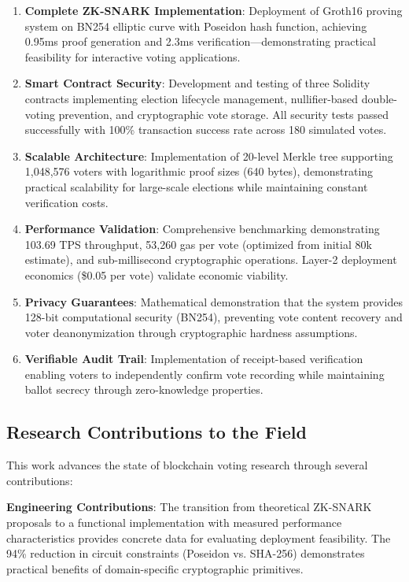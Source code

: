\documentclass[conference]{IEEEtran}
\begin{document}
\begin{enumerate}
    \item \textbf{Complete ZK-SNARK Implementation}: Deployment of Groth16 proving system on BN254 elliptic curve with Poseidon hash function, achieving 0.95ms proof generation and 2.3ms verification---demonstrating practical feasibility for interactive voting applications.
    
    \item \textbf{Smart Contract Security}: Development and testing of three Solidity contracts implementing election lifecycle management, nullifier-based double-voting prevention, and cryptographic vote storage. All security tests passed successfully with 100\% transaction success rate across 180 simulated votes.
    
    \item \textbf{Scalable Architecture}: Implementation of 20-level Merkle tree supporting 1,048,576 voters with logarithmic proof sizes (640 bytes), demonstrating practical scalability for large-scale elections while maintaining constant verification costs.
    
    \item \textbf{Performance Validation}: Comprehensive benchmarking demonstrating 103.69 TPS throughput, 53,260 gas per vote (optimized from initial 80k estimate), and sub-millisecond cryptographic operations. Layer-2 deployment economics (\$0.05 per vote) validate economic viability.
    
    \item \textbf{Privacy Guarantees}: Mathematical demonstration that the system provides 128-bit computational security (BN254), preventing vote content recovery and voter deanonymization through cryptographic hardness assumptions.
    
    \item \textbf{Verifiable Audit Trail}: Implementation of receipt-based verification enabling voters to independently confirm vote recording while maintaining ballot secrecy through zero-knowledge properties.
\end{enumerate}

\subsection{Research Contributions to the Field}

This work advances the state of blockchain voting research through several contributions:

\textbf{Engineering Contributions}: The transition from theoretical ZK-SNARK proposals to a functional implementation with measured performance characteristics provides concrete data for evaluating deployment feasibility. The 94\% reduction in circuit constraints (Poseidon vs. SHA-256) demonstrates practical benefits of domain-specific cryptographic primitives.
\end{document}
